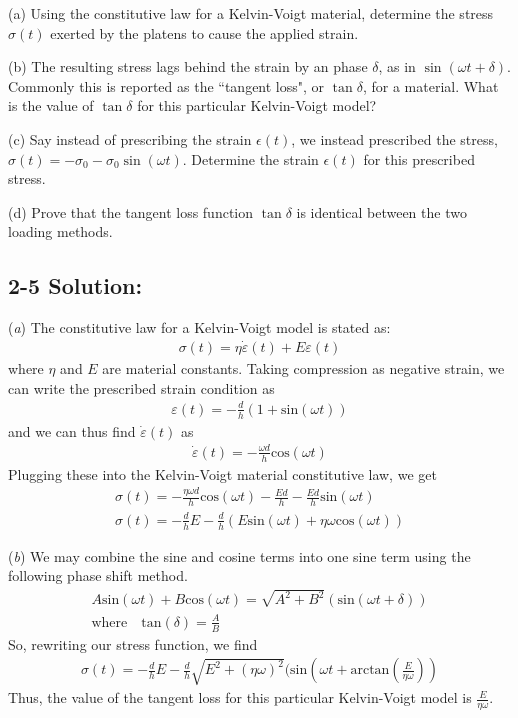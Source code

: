 \medskip
(a) Using the constitutive law for a Kelvin-Voigt material, determine the stress $\sigma(t)$ exerted by the platens to cause the applied strain. 

\medskip
(b) The resulting stress lags behind the strain by an phase $\delta$, as in $\sin(\omega t + \delta)$. 
Commonly this is reported as the ``tangent loss", or $\tan\delta$, for a material. 
What is the value of $\tan\delta$ for this particular Kelvin-Voigt model?

\medskip
(c) Say instead of prescribing the strain $\epsilon(t)$, we instead prescribed the stress, $\sigma(t) = - \sigma_0 - \sigma_0 \sin(\omega t)$. 
Determine the strain $\epsilon(t)$ for this prescribed stress.

\medskip
(d) Prove that the tangent loss function $\tan\delta$ is identical between the two loading methods.

\subsection*{\textbf{2-5 Solution:}}
(\textit{a}) The constitutive law for a Kelvin-Voigt model is stated as:
\begin{gather*}
    \sigma(t)=\eta\dot{\varepsilon}(t)+E\varepsilon(t)
\end{gather*}
where $\eta$ and $E$ are material constants. Taking compression as negative strain, we can write the prescribed strain condition as
\begin{gather*}
    \varepsilon(t)=-\frac{d}{h}(1+\text{sin}(\omega t))
\end{gather*}
and we can thus find $\dot{\varepsilon}(t)$ as
\begin{gather*}
    \dot{\varepsilon}(t)=-\frac{\omega d}{h}\text{cos}(\omega t)
\end{gather*}
Plugging these into the Kelvin-Voigt material constitutive law, we get
\begin{gather*}
    \sigma(t)=-\frac{\eta\omega d}{h}\text{cos}(\omega t)-\frac{Ed}{h}-\frac{Ed}{h}\text{sin}(\omega t)\\
    \sigma(t)=-\frac{d}{h}E-\frac{d}{h}(E\text{sin}(\omega t)+\eta\omega\text{cos}(\omega t))
\end{gather*}

(\textit{b}) We may combine the sine and cosine terms into one sine term using the following phase shift method.
\begin{gather*}
    A\text{sin}(\omega t)+B\text{cos}(\omega t)=\sqrt{A^2+B^2}(\text{sin}(\omega t + \delta))\\
    \text{where}\quad\text{tan}(\delta)=\frac{A}{B}
\end{gather*}
So, rewriting our stress function, we find
\begin{gather*}
    \sigma(t)=-\frac{d}{h}E-\frac{d}{h}\sqrt{E^2+(\eta\omega)^2}(\text{sin}(\omega t+ \text{arctan}(\frac{E}{\eta\omega}))
\end{gather*}
Thus, the value of the tangent loss for this particular Kelvin-Voigt model is $\frac{E}{\eta\omega}$.

